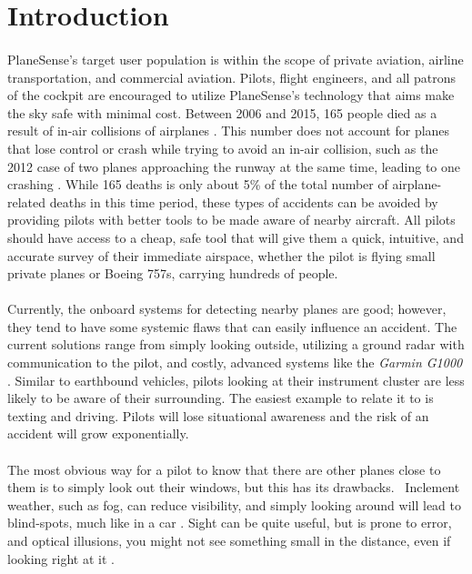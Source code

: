 \section{Introduction}
\paragraph{}
PlaneSense's target user population is within the scope of private aviation, airline transportation, and commercial aviation. Pilots, flight engineers, and all patrons of the cockpit are encouraged to utilize PlaneSense's technology that aims make the sky safe with minimal cost.  Between 2006 and 2015, 165 people died as a result of in-air collisions of airplanes \cite{Boeing}.  This number does not account for planes that lose control or crash while trying to avoid an in-air collision, such as the 2012 case of two planes approaching the runway at the same time, leading to one crashing \cite{brevard}.  While 165 deaths is only about 5\% of the total number of airplane-related deaths in this time period, these types of accidents can be avoided by providing pilots with better tools to be made aware of nearby aircraft.  All pilots should have access to a cheap, safe tool that will give them a quick, intuitive, and accurate survey of their immediate airspace, whether the pilot is flying small private planes or Boeing 757s, carrying hundreds of people.


\paragraph{}
Currently, the onboard systems for detecting nearby planes are good; however, they tend to have some systemic flaws that can easily influence an accident. The current solutions range from simply looking outside, utilizing a ground radar with communication to the pilot, and costly, advanced systems like the \textit{Garmin G1000} \cite{Garmin}. Similar to earthbound vehicles, pilots looking at their instrument cluster are less likely to be aware of their surrounding. The easiest example to relate it to is texting and driving. Pilots will lose situational awareness and the risk of an accident will grow exponentially.


\paragraph{}
The most obvious way for a pilot to know that there are other planes close to them is to simply look out their windows, but this has its drawbacks.  Inclement weather, such as fog, can reduce visibility, and simply looking around will lead to blind-spots, much like in a car \cite{LAX06LA056B}. Sight can be quite useful, but is prone to error, and optical illusions, you might not see something small in the distance, even if looking right at it \cite{Ken}. 


